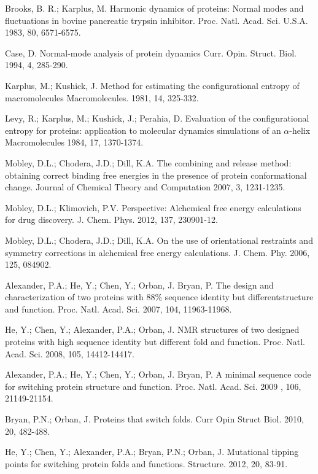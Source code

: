 \documentclass[12pt]{article}
\begin{document}
\begin{thebibliography}{99}
Brooks, B. R.; Karplus, M. Harmonic dynamics of proteins: Normal modes and fluctuations in bovine pancreatic trypsin inhibitor. Proc. Natl. Acad. Sci. U.S.A. 1983, 80, 6571-6575. 

Case, D. Normal-mode analysis of protein dynamics Curr. Opin. Struct. Biol. 1994, 4, 285-290.

Karplus, M.; Kushick, J. Method for estimating the configurational entropy of macromolecules Macromolecules. 1981, 14, 325-332.

Levy, R.; Karplus, M.; Kushick, J.; Perahia, D. Evaluation of the configurational entropy for proteins: application to molecular dynamics simulations of 
an $\alpha$-helix Macromolecules 1984, 17, 1370-1374.

Mobley, D.L.; Chodera, J.D.; Dill, K.A. The combining and release method: obtaining correct binding free energies in
the presence of protein conformational change. Journal of Chemical Theory and Computation 2007, 3, 1231-1235.

Mobley, D.L.; Klimovich, P.V. Perspective: Alchemical free energy calculations for drug discovery.
J. Chem. Phys. 2012, 137, 230901-12.

Mobley, D.L.; Chodera, J.D.; Dill, K.A. On the use of orientational restraints and symmetry corrections in alchemical
free energy calculations. J. Chem. Phy. 2006, 125, 084902.


Alexander, P.A.; He, Y.; Chen, Y.; Orban, J. Bryan, P. The design and characterization of two proteins with $88 \%$ sequence identity but differentstructure and 
function. Proc. Natl. Acad. Sci. 2007, 104, 11963-11968.

He, Y.; Chen, Y.; Alexander, P.A.; Orban, J. NMR structures of two designed proteins with high sequence identity but different fold and function. Proc. Natl. Acad. Sci. 2008, 105, 14412-14417.

Alexander, P.A.; He, Y.; Chen, Y.; Orban, J. Bryan, P. A minimal sequence code for switching protein structure and function. Proc. Natl. Acad. Sci. 2009
, 106, 21149-21154.

Bryan, P.N.; Orban, J. Proteins that switch folds. Curr Opin Struct Biol. 2010, 20, 482-488.

He, Y.; Chen, Y.; Alexander, P.A.; Bryan, P.N.; Orban, J. Mutational tipping points for switching protein folds and functions. Structure. 2012, 20,
83-91.


\end{thebibliography}
\end{document}
